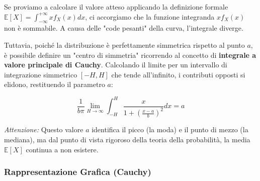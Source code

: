 Se proviamo a calcolare il valore atteso applicando la definizione formale $\mathbb{E}[X] = \int_{-\infty}^{+\infty} x f_X(x) dx$, ci accorgiamo che la funzione integranda $x f_X(x)$ non è sommabile. A causa delle "code pesanti" della curva, l'integrale diverge.

Tuttavia, poiché la distribuzione è perfettamente simmetrica rispetto al punto $a$, è possibile definire un "centro di simmetria" ricorrendo al concetto di \textbf{integrale a valore principale di Cauchy}. Calcolando il limite per un intervallo di integrazione simmetrico $[-H, H]$ che tende all'infinito, i contributi opposti si elidono, restituendo il parametro $a$:

\begin{equation}
\frac{1}{b\pi} \lim_{H \to \infty} \int_{-H}^{H} \frac{x}{1 + \left(\frac{x-a}{b}\right)^2} dx = a
\end{equation}

\textit{Attenzione:} Questo valore $a$ identifica il picco (la moda) e il punto di mezzo (la mediana), ma dal punto di vista rigoroso della teoria della probabilità, la media $\mathbb{E}[X]$ continua a non esistere.

\subsubsection{Rappresentazione Grafica (Cauchy)}


